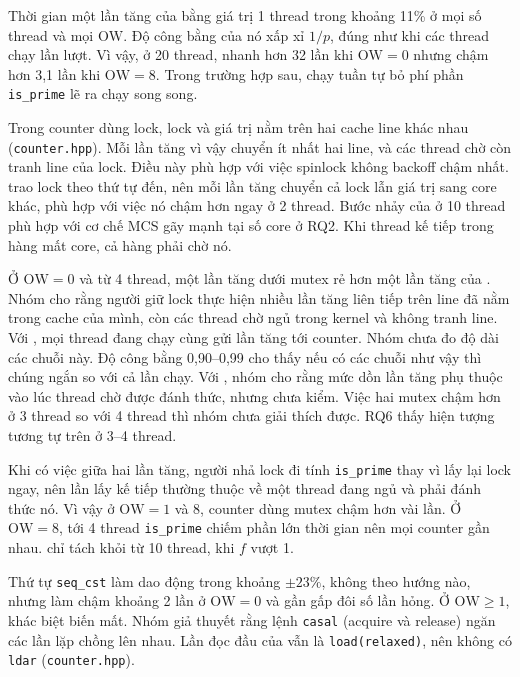 Thời gian một lần tăng của  bằng giá trị 1 thread trong khoảng 11\% ở mọi số thread và
mọi $\mathrm{OW}$. Độ công bằng của nó xấp xỉ $1/p$, đúng như khi các thread chạy lần lượt. Vì vậy, ở 20
thread,  nhanh hơn  32 lần khi $\mathrm{OW} = 0$ nhưng chậm hơn 3,1 lần khi
$\mathrm{OW} = 8$. Trong trường hợp sau, chạy tuần tự bỏ phí phần \texttt{is\_prime} lẽ ra chạy song song.

Trong counter dùng lock, lock và giá trị nằm trên hai cache line khác nhau (\texttt{counter.hpp}). Mỗi lần
tăng vì vậy chuyển ít nhất hai line, và các thread chờ còn tranh line của lock. Điều này phù hợp với việc
spinlock không backoff chậm nhất.  trao lock theo thứ tự đến, nên mỗi lần tăng chuyển
cả lock lẫn giá trị sang core khác, phù hợp với việc nó chậm hơn  ngay ở 2 thread. Bước
nhảy của  ở 10 thread phù hợp với cơ chế MCS gãy mạnh tại số core ở RQ2. Khi thread kế
tiếp trong hàng mất core, cả hàng phải chờ nó.

Ở $\mathrm{OW} = 0$ và từ 4 thread, một lần tăng dưới mutex rẻ hơn một lần tăng của . Nhóm
cho rằng người giữ lock thực hiện nhiều lần tăng liên tiếp trên line đã nằm trong cache của mình, còn
các thread chờ ngủ trong kernel và không tranh line. Với , mọi thread đang chạy cùng gửi lần
tăng tới counter. Nhóm chưa đo độ dài các chuỗi này. Độ công bằng
0,90--0,99 cho thấy nếu có các chuỗi như vậy thì chúng ngắn so với cả lần chạy. Với
, nhóm cho rằng mức dồn lần tăng phụ thuộc vào lúc thread chờ được đánh thức,
nhưng chưa kiểm. Việc hai mutex chậm hơn ở 3 thread so với 4 thread thì nhóm chưa giải thích được. RQ6
thấy hiện tượng tương tự trên  ở 3--4 thread.

Khi có việc giữa hai lần tăng, người nhả lock đi tính \texttt{is\_prime} thay vì lấy lại lock ngay, nên
lần lấy kế tiếp thường thuộc về một thread đang ngủ và phải đánh thức nó. Vì vậy ở $\mathrm{OW} = 1$ và 8,
counter dùng mutex chậm hơn  vài lần. Ở $\mathrm{OW} = 8$, tới 4 thread \texttt{is\_prime}
chiếm phần lớn thời gian nên mọi counter gần nhau.  chỉ tách khỏi  từ 10 thread,
khi $f$ vượt 1.

Thứ tự \texttt{seq\_cst} làm  dao động trong khoảng $\pm 23\%$, không theo hướng nào, nhưng
làm  chậm khoảng 2 lần ở $\mathrm{OW} = 0$ và gần gấp đôi số lần hỏng. Ở $\mathrm{OW} \ge 1$,
khác biệt biến mất. Nhóm giả thuyết rằng lệnh \texttt{casal} (acquire và release) ngăn các lần lặp chồng
lên nhau. Lần đọc đầu của  vẫn là \texttt{load(relaxed)}, nên không có \texttt{ldar}
(\texttt{counter.hpp}).

